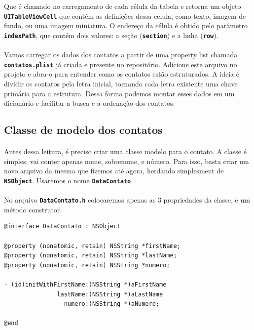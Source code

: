 \documentclass[a4paper,12pt,brazil,doubleside]{book}
\begin{document}
Que é chamado no carregamento de cada célula da tabela e retorna um objeto \texttt{\textbf{UITableViewCell}} que contém as definições dessa celula, como texto, imagem de fundo, ou uma imagem miniatura. O endereço da célula é obtido pelo parâmetro \texttt{\textbf{indexPath}}, que contém dois valores: a seção (\texttt{\textbf{section}}) e a linha (\texttt{\textbf{row}}).
\paragraph{}Vamos carregar os dados dos contatos a partir de uma property list chamada \texttt{\textbf{contatos.plist}} já criada e presente no repositório. Adicione este arquivo no projeto e abra-o para entender como os contatos estão estruturados. A ideia é dividir os contatos pela letra inicial, tornando cada letra existente uma chave primária para a estrutura. Dessa forma podemos montar esses dados em um dicionário e facilitar a busca e a ordenação dos contatos.

\pagebreak

\subsection{Classe de modelo dos contatos}

\paragraph{}Antes dessa leitura, é preciso criar uma classe modelo para o contato. A classe é simples, vai conter apenas nome, sobrenome, e número. Para isso, basta criar um novo arquivo da mesma que fizemos até agora, herdando simplesment de \texttt{\textbf{NSObject}}. Usaremos o nome \texttt{\textbf{DataContato}}.
\paragraph{}No arquivo \texttt{\textbf{DataContato.h}} colocaremos apenas as 3 propriedades da classe, e um método construtor.

\begin{listing}
\begin{verbatim}
@interface DataContato : NSObject

@property (nonatomic, retain) NSString *firstName;
@property (nonatomic, retain) NSString *lastName;
@property (nonatomic, retain) NSString *numero;

- (id)initWithFirstName:(NSString *)aFirstName
               lastName:(NSString *)aLastName
                 numero:(NSString *)aNumero;

@end
\end{verbatim}
\end{listing}
\end{document}
